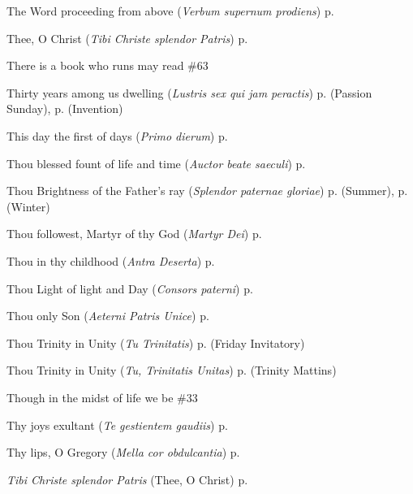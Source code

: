 \begin{hangparas}{1.25em}{1}
\par\noindent
The Word proceeding from above (\textit{Verbum supernum prodiens}) \dotfill p. \pageref{CorpusChristiMattins}
\par\noindent
Thee, O Christ (\textit{Tibi Christe splendor Patris}) \dotfill p. \pageref{MichaelEvensong}
\par\noindent
There is a book who runs may read \dotfill \#63
\par\noindent
Thirty years among us dwelling (\textit{Lustris sex qui jam peractis}) \dotfill p. \pageref{PassionSundayMattins} (Passion Sunday), p. \pageref{InventionMattins} (Invention)
\par\noindent
This day the first of days (\textit{Primo dierum}) \dotfill p. \pageref{SundayInvitatoryWinter}
\par\noindent
Thou blessed fount of life and time (\textit{Auctor beate saeculi}) \dotfill p. \pageref{CompassionEvensong}
\par\noindent
Thou Brightness of the Father's ray (\textit{Splendor paternae gloriae}) \dotfill p. \pageref{MondayMattinsSummer} (Summer), p. \pageref{MondayMattinsWinter} (Winter)
\par\noindent
Thou followest, Martyr of thy God (\textit{Martyr Dei}) \dotfill p. \pageref{StephenMattins}
\par\noindent
Thou in thy childhood (\textit{Antra Deserta}) \dotfill p. \pageref{JohnBaptistInvitatory}
\par\noindent
Thou Light of light and Day (\textit{Consors paterni}) \dotfill p. \pageref{TuesdayInvitatory}
\par\noindent
Thou only Son (\textit{Aeterni Patris Unice}) \dotfill p. \pageref{MaryMagdaleneMattins}
\par\noindent
Thou Trinity in Unity (\textit{Tu Trinitatis}) \dotfill p. \pageref{FridayInvitatory} (Friday Invitatory)
\par\noindent
Thou Trinity in Unity (\textit{Tu, Trinitatis Unitas}) \dotfill p. \pageref{TrinityMattins} (Trinity Mattins)
\par\noindent
Though in the midst of life we be \dotfill \#33
\par\noindent
Thy joys exultant (\textit{Te gestientem gaudiis}) \dotfill p. \pageref{HolyRosaryEvensongII}
\par\noindent
Thy lips, O Gregory (\textit{Mella cor obdulcantia}) \dotfill p. \pageref{GregoryMattins}
\par\noindent
\textit{Tibi Christe splendor Patris} (Thee, O Christ) \dotfill p. \pageref{MichaelEvensong}

\end{hangparas}
